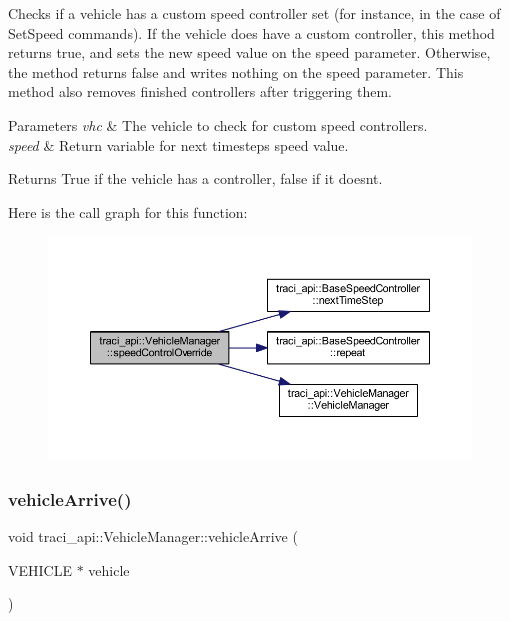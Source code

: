 Checks if a vehicle has a custom speed controller set (for instance, in the case of Set\+Speed commands). If the vehicle does have a custom controller, this method returns true, and sets the new speed value on the speed parameter. Otherwise, the method returns false and writes nothing on the speed parameter. This method also removes finished controllers after triggering them. 


\begin{DoxyParams}{Parameters}
{\em vhc} & The vehicle to check for custom speed controllers. \\
\hline
{\em speed} & Return variable for next timesteps speed value. \\
\hline
\end{DoxyParams}
\begin{DoxyReturn}{Returns}
True if the vehicle has a controller, false if it doesn\textquotesingle{}t. 
\end{DoxyReturn}
Here is the call graph for this function\+:
\nopagebreak
\begin{figure}[H]
\begin{center}
\leavevmode
\includegraphics[width=350pt]{classtraci__api_1_1_vehicle_manager_acebd30eec75b857573c9237d9a15244f_cgraph}
\end{center}
\end{figure}
\mbox{\label{classtraci__api_1_1_vehicle_manager_a336d2616be8e4e0c9da5d29d7f122ad6}} 
\subsubsection{\texorpdfstring{vehicle\+Arrive()}{vehicleArrive()}}
{\footnotesize\ttfamily void traci\+\_\+api\+::\+Vehicle\+Manager\+::vehicle\+Arrive (\begin{DoxyParamCaption}\item[{V\+E\+H\+I\+C\+LE $\ast$}]{vehicle }\end{DoxyParamCaption})}



